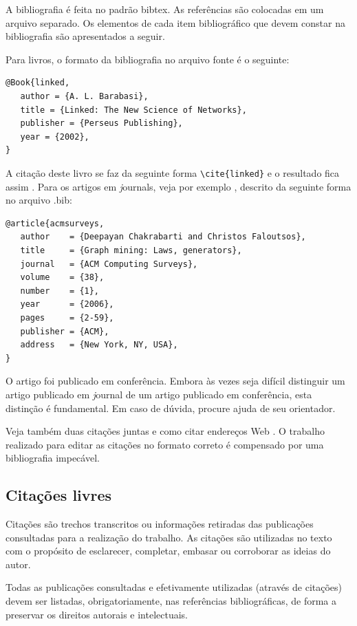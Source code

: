 A bibliografia é feita no padrão {\ttfamily bibtex}.
As referências são colocadas em um arquivo separado.
Os elementos de cada item bibliográfico que devem constar na bibliografia são apresentados a seguir.

Para livros, o formato da bibliografia no arquivo fonte é o seguinte:

\begin{verbatim}
@Book{linked,
   author = {A. L. Barabasi},
   title = {Linked: The New Science of Networks},
   publisher = {Perseus Publishing},
   year = {2002},
}
\end{verbatim}

A citação deste livro se faz da seguinte forma \verb#\cite{linked}# e o resultado fica assim \cite{linked}.
Para os artigos em {\textit journals}, veja por exemplo \cite{acmsurveys},
descrito da seguinte forma no arquivo {\ttfamily .bib}:

\begin{verbatim}
@article{acmsurveys,
   author    = {Deepayan Chakrabarti and Christos Faloutsos},
   title     = {Graph mining: Laws, generators},
   journal   = {ACM Computing Surveys},
   volume    = {38},
   number    = {1},
   year      = {2006},
   pages     = {2-59},
   publisher = {ACM},
   address   = {New York, NY, USA},
}
\end{verbatim}

O artigo \cite{3faloutsos} foi publicado em conferência. Embora
às vezes seja difícil distinguir um artigo publicado em {\textit
 journal} de um artigo publicado em conferência, esta distinção é
fundamental. Em caso de dúvida, procure ajuda de seu orientador.

Veja também duas citações juntas \cite{rp99,mar00} e como citar
endereços Web \cite{irl:06}.
O trabalho realizado para editar as citações no formato correto é
compensado por uma bibliografia impecável.

\subsection{Citações livres}\label{citacoesLivres}
Citações são trechos transcritos ou informações retiradas das publicações consultadas para a realização do trabalho.
As citações são utilizadas no texto com o propósito de esclarecer, completar, embasar ou corroborar as ideias do autor.

Todas as publicações consultadas e efetivamente utilizadas (através de citações) devem ser listadas, obrigatoriamente, nas referências bibliográficas, de forma a preservar os direitos autorais e intelectuais.

